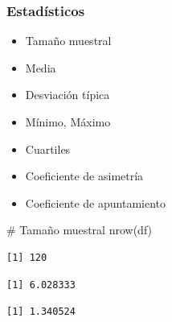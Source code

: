 \documentclass[
  a4paper,
]{scrreport}
\newenvironment{Shaded}{\begin{snugshade}}{\end{snugshade}}
\newcommand{\AttributeTok}[1]{\textcolor[rgb]{0.40,0.45,0.13}{#1}}
\newcommand{\CommentTok}[1]{\textcolor[rgb]{0.37,0.37,0.37}{#1}}
\newcommand{\ConstantTok}[1]{\textcolor[rgb]{0.56,0.35,0.01}{#1}}
\newcommand{\FunctionTok}[1]{\textcolor[rgb]{0.28,0.35,0.67}{#1}}
\newcommand{\NormalTok}[1]{\textcolor[rgb]{0.00,0.23,0.31}{#1}}
\newcommand{\SpecialCharTok}[1]{\textcolor[rgb]{0.37,0.37,0.37}{#1}}
\providecommand{\tightlist}{%
  \setlength{\itemsep}{0pt}\setlength{\parskip}{0pt}}\usepackage{longtable,booktabs,array}
\theoremstyle{definition}
\theoremstyle{definition}
\theoremstyle{remark}
\begin{document}
\hypertarget{estaduxedsticos}{%
\subsubsection{Estadísticos}\label{estaduxedsticos}}

\begin{itemize}
\tightlist
\item
  Tamaño muestral
\item
  Media
\item
  Desviación típica
\item
  Mínimo, Máximo
\item
  Cuartiles
\item
  Coeficiente de asimetría
\item
  Coeficiente de apuntamiento
\end{itemize}

\begin{Shaded}
\begin{Highlighting}[]
\CommentTok{\# Tamaño muestral}
\FunctionTok{nrow}\NormalTok{(df)}
\end{Highlighting}
\end{Shaded}

\begin{verbatim}
[1] 120
\end{verbatim}

\begin{Shaded}
\end{Shaded}

\begin{verbatim}
[1] 6.028333
\end{verbatim}

\begin{Shaded}
\end{Shaded}

\begin{verbatim}
[1] 1.340524
\end{verbatim}

\begin{Shaded}
\end{Shaded}
\end{document}

